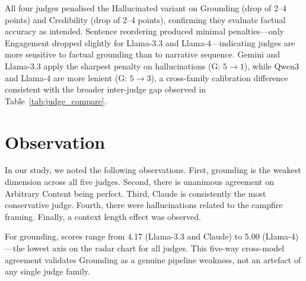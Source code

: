 \documentclass{article}
\begin{document}
\begin{table}[htbp]
\centering
\caption{Robustness test: four judges $\times$ three dialogue variants. G=Grounding, C=Coherence, Cr=Credibility, En=Engagement. Gem=Gemini, L3=Llama-3.3, Qw=Qwen3, L4=Llama-4.}
\label{tab:robustness}
\end{table}

All four judges penalised the Hallucinated variant on Grounding (drop of 2--4 points) and Credibility (drop of 2--4 points), confirming they evaluate factual accuracy as intended. Sentence reordering produced minimal penalties---only Engagement dropped slightly for Llama-3.3 and Llama-4---indicating judges are more sensitive to factual grounding than to narrative sequence. Gemini and Llama-3.3 apply the sharpest penalty on hallucinations (G: $5\to1$), while Qwen3 and Llama-4 are more lenient (G: $5\to3$), a cross-family calibration difference consistent with the broader inter-judge gap observed in Table~\ref{tab:judge_compare}.

\section{Observation}

In our study, we noted the following observations. First, grounding is the weakest dimension across all five judges.
Second, there is unanimous agreement on Arbitrary Content being perfect.
Third, Claude is consistently the most conservative judge.
Fourth, there were hallucinations related to the campfire framing.
Finally, a context length effect was observed.

For grounding, scores range from 4.17 (Llama-3.3 and Claude) to 5.00 (Llama-4)---the lowest axis on the radar chart for all judges. This five-way cross-model agreement validates Grounding as a genuine pipeline weakness, not an artefact of any single judge family.
\end{document}

